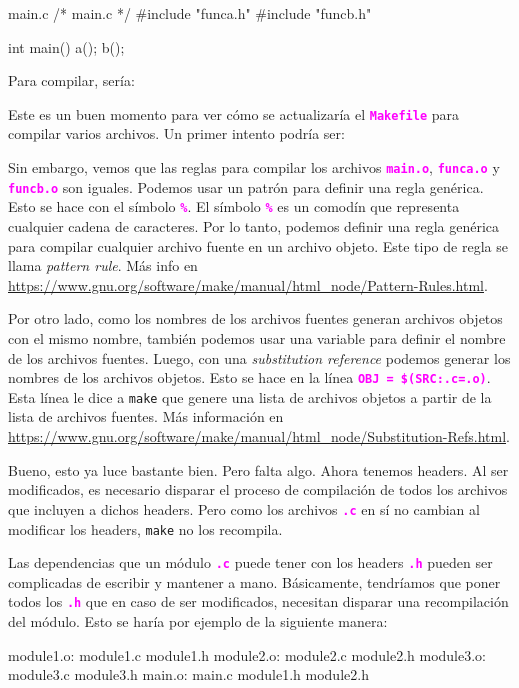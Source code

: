 \documentclass[]{scrartcl}
\newcommand{\hl}[1]{\textcolor{magenta}{\textbf{\texttt{#1}}}}
\begin{document}
\begin{cbox}[]{main.c}
  /* main.c */
  #include "funca.h"
  #include "funcb.h"
  
  int main(){
    a();
    b();
  }
\end{cbox}

Para compilar, sería:


Este es un buen momento para ver cómo se actualizaría el \hl{Makefile} para compilar varios archivos. Un primer intento podría ser:


Sin embargo, vemos que las reglas para compilar los archivos \hl{main.o}, \hl{funca.o} y \hl{funcb.o} son iguales. Podemos usar un patrón para definir una regla genérica. Esto se hace con el símbolo \hl{\%}. El símbolo \hl{\%} es un comodín que representa cualquier cadena de caracteres. Por lo tanto, podemos definir una regla genérica para compilar cualquier archivo fuente en un archivo objeto. Este tipo de regla se llama \textit{pattern rule}. Más info en \url{https://www.gnu.org/software/make/manual/html_node/Pattern-Rules.html}.

Por otro lado, como los nombres de los archivos fuentes generan archivos objetos con el mismo nombre, también podemos usar una variable para definir el nombre de los archivos fuentes. Luego, con una \textit{substitution reference} podemos generar los nombres de los archivos objetos. Esto se hace en la línea \hl{OBJ = \$(SRC:.c=.o)}. Esta línea le dice a \texttt{make} que genere una lista de archivos objetos a partir de la lista de archivos fuentes. Más información en \url{https://www.gnu.org/software/make/manual/html_node/Substitution-Refs.html}.


Bueno, esto ya luce bastante bien. Pero falta algo. Ahora tenemos headers. Al ser modificados, es necesario disparar el proceso de compilación de todos los archivos que incluyen a dichos headers. Pero como los archivos \hl{.c} en sí no cambian al modificar los headers, \texttt{make} no los recompila. 

Las dependencias que un módulo \hl{.c} puede tener con los headers \hl{.h} pueden ser complicadas de escribir y mantener a mano. Básicamente, tendríamos que poner todos los \hl{.h} que en caso de ser modificados, necesitan disparar una recompilación del módulo. Esto se haría por ejemplo de la siguiente manera:
\begin{bashbox}[minted language=make]
  module1.o: module1.c module1.h
  module2.o: module2.c module2.h
  module3.o: module3.c module3.h
  main.o: main.c module1.h module2.h
\end{bashbox}
\end{document}
